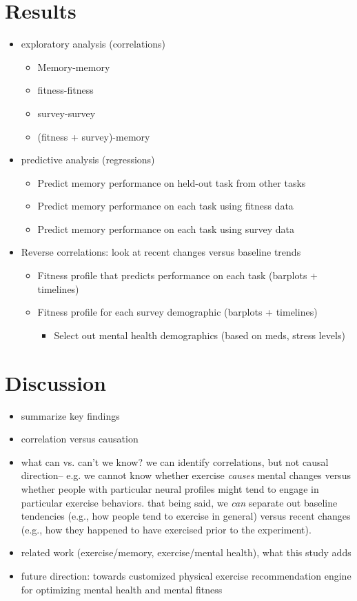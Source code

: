 \documentclass[10pt]{article}
\begin{document}
\section*{Results}
\begin{itemize}
  \item exploratory analysis (correlations)
    \begin{itemize}
    \item Memory-memory
    \item fitness-fitness
    \item survey-survey
    \item (fitness + survey)-memory
    \end{itemize}
  \item predictive analysis (regressions)
    \begin{itemize}
    \item Predict memory performance on held-out task from other tasks
    \item Predict memory performance on each task using fitness data
      \item Predict memory performance on each task using survey data
      \end{itemize}
    \item Reverse correlations: look at recent changes versus baseline trends
      \begin{itemize}
      \item Fitness profile that predicts performance on each task (barplots + timelines)
      \item Fitness profile for each survey demographic (barplots + timelines)
        \begin{itemize}
          \item Select out mental health demographics (based on meds, stress levels)
          \end{itemize}
        \end{itemize}
  \end{itemize}

  \section*{Discussion}
  \begin{itemize}
  \item summarize key findings
  \item correlation versus causation
         \item what can vs. can't we know?  we can identify correlations, but not causal direction-- e.g. we cannot know whether exercise \textit{causes} mental changes versus whether people with particular neural profiles might tend to engage in particular exercise behaviors.  that being said, we \textit{can} separate out baseline tendencies (e.g., how people tend to exercise in general) versus recent changes (e.g., how they happened to have exercised prior to the experiment).
  \item related work (exercise/memory, exercise/mental health), what this study adds
    \item future direction: towards customized physical exercise recommendation engine for optimizing mental health and mental fitness
    \end{itemize}
\end{document}
